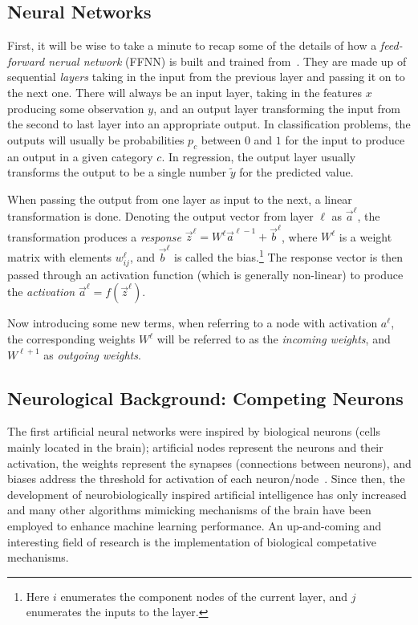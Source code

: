      

\subsection{Neural Networks}
    First, it will be wise to take a minute to recap some of the details of how a \textit{feed-forward nerual network} (FFNN) is built and trained from~\cite{Project2}. They are made up of sequential \textit{layers} taking in the input from the previous layer and passing it on to the next one. There will always be an input layer, taking in the features $x$ producing some observation $y$, and an output layer transforming the input from the second to last layer into an appropriate output. In classification problems, the outputs will usually be probabilities $p_c$ between $0$ and $1$ for the input to produce an output in a given category $c$. In regression, the output layer usually transforms the output to be a single number $\tilde{y}$ for the predicted value.

    When passing the output from one layer as input to the next, a linear transformation is done. Denoting the output vector from layer $\ell$ as $\vec{a}^\ell$, the transformation produces a \textit{response} $\vec{z}^{\ell} = W^\ell \vec{a}^{\ell-1} + \vec{b}^\ell$, where $W^\ell$ is a weight matrix with elements $w^\ell_{ij}$, and $\vec{b}^\ell$ is called the bias.\footnote{Here $i$ enumerates the component nodes of the current layer, and $j$ enumerates the inputs to the layer.} The response vector is then passed through an activation function (which is generally non-linear) to produce the \textit{activation} $\vec{a}^\ell = f(\vec{z}^\ell)$.

    Now introducing some new terms, when referring to a node with activation $a^\ell$, the corresponding weights $W^\ell$ will be referred to as the \textit{incoming weights}, and $W^{\ell + 1}$ as \textit{outgoing weights}.

\subsection{Neurological Background: Competing Neurons}
    The first artificial neural networks were inspired by biological neurons (cells mainly located in the brain); artificial nodes represent the neurons and their activation, the weights represent the synapses (connections between neurons), and biases address the threshold for activation of each neuron/node~\citep{Project2}. Since then, the development of neurobiologically inspired artificial intelligence has only increased and many other algorithms mimicking mechanisms of the brain have been employed to enhance machine learning performance. An up-and-coming and interesting field of research is the implementation of biological competative mechanisms. 
    
